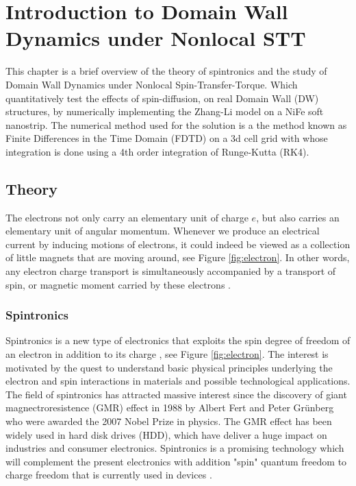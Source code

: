 
\chapter{Introduction to Domain Wall Dynamics under Nonlocal STT} %

\label{Introduction to Domain Wall Dynamics under Nonlocal STT} %



This chapter is a brief overview of the theory of spintronics and the study of Domain Wall Dynamics under Nonlocal Spin-Transfer-Torque. Which quantitatively test the effects of spin-diffusion, on real Domain Wall (DW) structures, by numerically implementing the Zhang-Li model on a NiFe soft nanostrip. The numerical method used for the solution is a the method known as Finite Differences in the Time Domain (FDTD) on a 3d cell grid with whose integration is done using a 4th order integration of Runge-Kutta (RK4).

\section{Theory}

 The electrons not only carry an elementary
unit of charge $e$, but also carries an elementary unit of angular momentum. Whenever we produce an electrical current by inducing
motions of electrons, it could indeed be viewed as a collection of little magnets that are moving around, see Figure \ref{fig:electron}. In other words, any electron charge transport is simultaneously accompanied by a transport of spin, or magnetic moment carried by these electrons \cite{cornell}.

\subsection{Spintronics}

Spintronics is a new type of electronics that exploits the spin degree of freedom of an electron in addition to its charge \cite{spinz},  see Figure \ref{fig:electron}. The interest is motivated by the quest to understand basic physical principles underlying the electron and spin interactions in materials and possible technological applications. The field of spintronics has attracted massive interest since the discovery of giant magnectroresistence (GMR) effect in 1988 by Albert Fert and Peter Gr\"{u}nberg who were awarded the 2007 Nobel Prize in physics. The GMR effect has been widely used in hard disk drives (HDD), which have deliver a huge impact on industries and consumer electronics. Spintronics is a promising technology which will complement the present electronics with addition "spin" quantum freedom to charge freedom that is currently used in devices \cite{nonlocalspin}.

